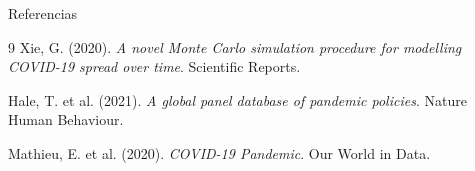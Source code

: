 \documentclass[aspectratio=169]{beamer}
\begin{document}
\begin{frame}[allowframebreaks]{Referencias}
  \begin{thebibliography}{9}
    Xie, G. (2020).
    \textit{A novel Monte Carlo simulation procedure for modelling COVID-19 spread over time}.
    Scientific Reports.

    Hale, T. et al. (2021).
    \textit{A global panel database of pandemic policies}.
    Nature Human Behaviour.

    Mathieu, E. et al. (2020).
    \textit{COVID-19 Pandemic}.
    Our World in Data.
  \end{thebibliography}
\end{frame}
\end{document}
